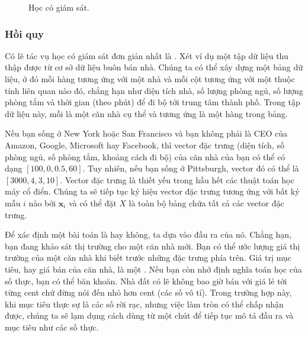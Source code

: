 \documentclass[letterpaper,11pt,english]{sphinxmanual}
\begin{document}
\begin{figure}[H]
\centering
\capstart

\noindent{}
\caption{Học có giám sát.}\label{\detokenize{chapter_introduction/index_vn:id11}}\label{\detokenize{chapter_introduction/index_vn:fig-supervised-learning}}\end{figure}




\subsubsection{Hồi quy}
\label{\detokenize{chapter_introduction/index_vn:hoi-quy}}


Có lẽ tác vụ học có giám sát đơn giản nhất là . Xét ví dụ một
tập dữ liệu thu thập được từ cơ sở dữ liệu buôn bán nhà. Chúng ta có thể
xây dựng một bảng dữ liệu, ở đó mỗi hàng tương ứng với một nhà và mỗi
cột tương ứng với một thuộc tính liên quan nào đó, chẳng hạn như diện
tích nhà, số lượng phòng ngủ, số lượng phòng tắm và thời gian (theo
phút) để đi bộ tới trung tâm thành phố. Trong tập dữ liệu này, mỗi 
là một căn nhà cụ thể và  tương ứng là một hàng trong
bảng.



Nếu bạn sống ở New York hoặc San Francisco và bạn không phải là CEO của
Amazon, Google, Microsoft hay Facebook, thì vector đặc trưng (diện tích,
số phòng ngủ, số phòng tắm, khoảng cách đi bộ) của căn nhà của bạn có
thể có dạng \([100, 0, 0.5, 60]\). Tuy nhiên, nếu bạn sống ở
Pittsburgh, vector đó có thể là \([3000, 4, 3, 10]\). Vector đặc
trưng là thiết yếu trong hầu hết các thuật toán học máy cổ điển. Chúng
ta sẽ tiếp tục ký hiệu vector đặc trưng tương ứng với bất ký mẫu
\(i\) nào bởi \(\mathbf{x}_i\) và có thể đặt \(X\) là toàn
bộ bảng chứa tất cả các vector đặc trưng.



Để xác định một bài toán là  hay không, ta dựa vào đầu ra của
nó. Chẳng hạn, bạn đang khảo sát thị trường cho một căn nhà mới. Bạn có
thể ước lượng giá thị trường của một căn nhà khi biết trước những đặc
trưng phía trên. Giá trị mục tiêu, hay giá bán của căn nhà, là một . Nếu bạn còn nhớ định nghĩa toán học của số thực, bạn có thể băn
khoăn. Nhà đất có lẽ không bao giờ bán với giá lẻ tới từng cent chứ đừng
nói đến nhỏ hơn cent (các số vô tỉ). Trong trường hợp này, khi mục tiêu
thực sự là các số rời rạc, nhưng việc làm tròn có thể chấp nhận được,
chúng ta sẽ lạm dụng cách dùng từ một chút để tiếp tục mô tả đầu ra và
mục tiêu như các số thực.
\end{document}

